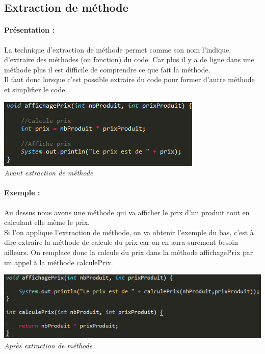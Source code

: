 \documentclass[a4paper,twoside,12pt,openright]{report}
\begin{document}
\newpage

\subsection{Extraction de méthode}
\paragraph{Présentation :} 
La technique d'extraction de méthode permet comme son nom l'indique, d'extraire des méthodes (ou fonction) du code. Car plus il y a de ligne dans une méthode plus il est difficile de comprendre ce que fait la méthode.\\
Il faut donc lorsque c'est possible extraire du code pour former d'autre méthode et simplifier le code.
\begin{center}
\includegraphics[scale=1]{Image/Extraction_Methode.png}\\
\itshape{Avant extraction de méthode}
\end{center}

\paragraph{Exemple :} 
Au dessus nous avons une méthode qui va afficher le prix d'un produit tout en calculant elle même le prix.\\
Si l'on applique l'extraction de méthode, on va obtenir l'exemple du bas, c'est à dire extraire la méthode de calcule du prix car on en aura surement besoin ailleurs. On remplace donc la calcule du prix dans la méthode affichagePrix par un appel à la méthode calculePrix.\\
\begin{center}
\includegraphics[scale=1]{Image/Extraction_Methode2.png}\\
\itshape{Après extraction de méthode}
\end{center}
\end{document}
